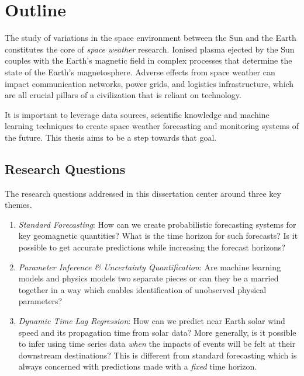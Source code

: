 \chapter{Outline}\label{chapter:Outline}

The study of variations in the space environment between the Sun and the Earth constitutes 
the core of \textit{space weather} research. Ionised plasma ejected by the Sun couples with 
the Earth’s magnetic field in complex processes that determine the state of the Earth's 
magnetosphere. Adverse effects from space weather can impact communication networks, 
power grids, and logistics infrastructure, which are all crucial pillars of a civilization that 
is reliant on technology.

It is important to leverage data sources, scientific knowledge and machine learning 
techniques to create space weather forecasting and monitoring systems of the future. This 
thesis aims to be a step towards that goal. 

\section{Research Questions}

The research questions addressed in this dissertation center around three key themes.

\begin{enumerate}
    \item \textit{Standard Forecasting}: How can we create probabilistic forecasting systems 
    for key geomagnetic quantities? What is the time horizon for such forecasts? Is it possible 
    to get accurate predictions while increasing the forecast horizons?
    
    \item \textit{Parameter Inference \& Uncertainty Quantification}: Are machine learning models 
    and physics models two separate pieces or can they be a married together in a way which enables 
    identification of unobserved physical parameters?  
    
    \item \textit{Dynamic Time Lag Regression}: How can we predict near Earth solar wind speed 
    and its propagation time from solar data? More generally, is it possible to infer using time series 
    data \emph{when} the impacts of events will be felt at their downstream destinations? This is different 
    from standard forecasting which is always concerned with predictions made with a \emph{fixed} time horizon.
\end{enumerate}
    

